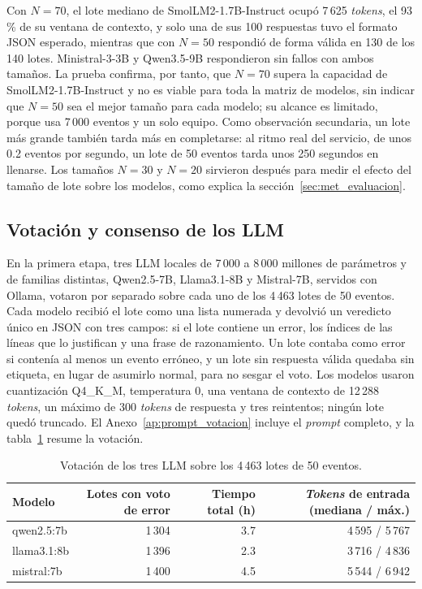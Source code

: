 Con $N = 70$, el lote mediano de SmolLM2-1.7B-Instruct ocupó 7\,625 \textit{tokens}, el 93\,\% de su ventana de contexto, y solo una de sus 100 respuestas tuvo el formato JSON esperado, mientras que con $N = 50$ respondió de forma válida en 130 de los 140 lotes. Ministral-3-3B y Qwen3.5-9B respondieron sin fallos con ambos tamaños. La prueba confirma, por tanto, que $N = 70$ supera la capacidad de SmolLM2-1.7B-Instruct y no es viable para toda la matriz de modelos, sin indicar que $N = 50$ sea el mejor tamaño para cada modelo; su alcance es limitado, porque usa 7\,000 eventos y un solo equipo. Como observación secundaria, un lote más grande también tarda más en completarse: al ritmo real del servicio, de unos 0.2 eventos por segundo, un lote de 50 eventos tarda unos 250 segundos en llenarse. Los tamaños $N = 30$ y $N = 20$ sirvieron después para medir el efecto del tamaño de lote sobre los modelos, como explica la sección~\ref{sec:met_evaluacion}.

\subsection{Votación y consenso de los LLM}\label{subsec:met_votacion}\label{subsec:met_kappa}

En la primera etapa, tres LLM locales de 7\,000 a 8\,000 millones de parámetros y de familias distintas, Qwen2.5-7B, Llama3.1-8B y Mistral-7B, servidos con Ollama, votaron por separado sobre cada uno de los 4\,463 lotes de 50 eventos. Cada modelo recibió el lote como una lista numerada y devolvió un veredicto único en JSON con tres campos: si el lote contiene un error, los índices de las líneas que lo justifican y una frase de razonamiento. Un lote contaba como error si contenía al menos un evento erróneo, y un lote sin respuesta válida quedaba sin etiqueta, en lugar de asumirlo normal, para no sesgar el voto. Los modelos usaron cuantización Q4\_K\_M, temperatura 0, una ventana de contexto de 12\,288 \textit{tokens}, un máximo de 300 \textit{tokens} de respuesta y tres reintentos; ningún lote quedó truncado. El Anexo~\ref{ap:prompt_votacion} incluye el \textit{prompt} completo, y la tabla~\ref{tab:met_votos} resume la votación.

\begin{table}[H]
\centering
\caption{Votación de los tres LLM sobre los 4\,463 lotes de 50 eventos.}
\label{tab:met_votos}
\small
\begin{tabular}{@{}lrrr@{}}
\toprule
\textbf{Modelo} & \textbf{Lotes con voto de error} & \textbf{Tiempo total (h)} & \textbf{\textit{Tokens} de entrada (mediana / máx.)} \\
\midrule
qwen2.5:7b & 1\,304 & 3.7 & 4\,595 / 5\,767 \\
llama3.1:8b & 1\,396 & 2.3 & 3\,716 / 4\,836 \\
mistral:7b & 1\,400 & 4.5 & 5\,544 / 6\,942 \\
\bottomrule
\end{tabular}
\normalsize
\end{table}


